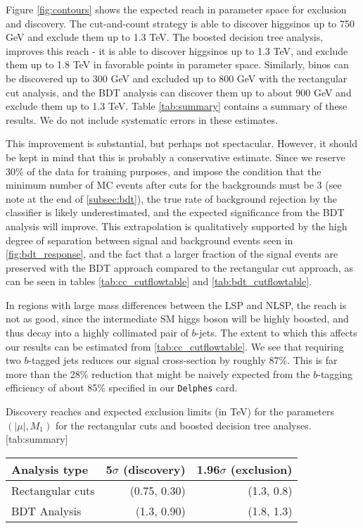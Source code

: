 Figure \ref{fig:contours} shows the expected reach in parameter space for exclusion and discovery. The cut-and-count strategy is able to discover higgsinos up to 750 GeV  and exclude them up to 1.3 TeV. The boosted decision tree analysis, improves this reach - it is able to discover higgsinos up to 1.3 TeV, and exclude them up to 1.8 TeV in favorable points in parameter space. Similarly, binos can be discovered up to 300 GeV and excluded up to 800 GeV with the rectangular cut analysis, and the BDT analysis can discover them up to about 900 GeV and exclude them up to 1.3 TeV. Table \ref{tab:summary} contains a summary of these results. We do not include systematic errors in these estimates.  

This improvement is substantial, but perhaps not spectacular. However, it should be kept in mind that this is probably a conservative estimate. Since we reserve 30\% of the data for training purposes, and impose the condition that the minimum number of MC events after cuts for the backgrounds must be 3 (see note at the end of \autoref{subsec:bdt}), the true rate of background rejection by the classifier is likely underestimated, and the expected significance from the BDT analysis will improve. This extrapolation is qualitatively supported by the high degree of separation between signal and background events seen in \autoref{fig:bdt_response}, and the fact that a larger fraction of the signal events are preserved with the BDT approach compared to the rectangular cut approach, as can be seen in tables \ref{tab:cc_cutflowtable} and \ref{tab:bdt_cutflowtable}. 

In regions with large mass differences between the LSP and NLSP, the reach is not as good, since the intermediate SM higgs boson will be highly boosted, and thus decay into a highly collimated pair of $b$-jets. The extent to which this affects our results can be estimated from \autoref{tab:cc_cutflowtable}. We see that requiring two $b$-tagged jets reduces our signal cross-section by roughly 87\%. This is far more than the 28\% reduction that might be naively expected from the $b$-tagging efficiency of about 85\% specified in our \texttt{Delphes} card. 

\begin{table}
  \begin{sidecaption}{Discovery reaches and expected exclusion limits (in TeV) for the parameters $(|\mu|,M_1)$ for the rectangular cuts and boosted decision tree analyses.}[tab:summary]
\centering
\begin{tabular}{lrr}
\toprule
Analysis type & 5$\sigma$ (discovery)& 1.96$\sigma$ (exclusion)\\
\midrule
Rectangular cuts & (0.75, 0.30) & (1.3, 0.8)\\
BDT Analysis & (1.3, 0.90) & (1.8, 1.3)\\
\bottomrule
\end{tabular}
\end{sidecaption}

\end{table}

